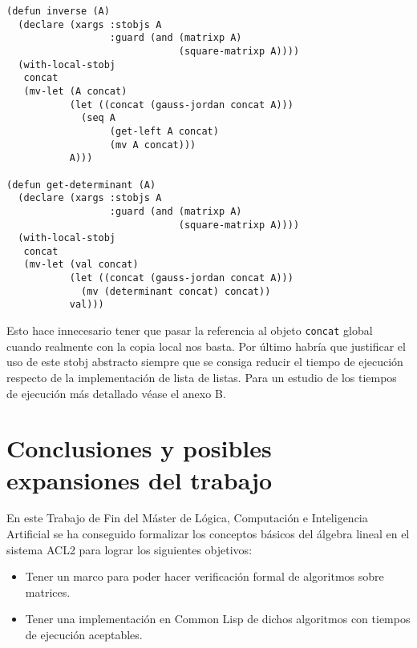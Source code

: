 \documentclass[a4paper,10pt]{article}
\begin{document}
\par \vspace{10pt}

\begin{lstlisting}[language=clips]
(defun inverse (A)
  (declare (xargs :stobjs A
                  :guard (and (matrixp A)
                              (square-matrixp A))))
  (with-local-stobj
   concat
   (mv-let (A concat)
           (let ((concat (gauss-jordan concat A)))
             (seq A
                  (get-left A concat)
                  (mv A concat)))
           A)))

(defun get-determinant (A)
  (declare (xargs :stobjs A
                  :guard (and (matrixp A)
                              (square-matrixp A))))
  (with-local-stobj
   concat
   (mv-let (val concat)
           (let ((concat (gauss-jordan concat A)))
             (mv (determinant concat) concat))
           val)))
\end{lstlisting}

\par \vspace{10pt}

Esto hace innecesario tener que pasar la referencia al objeto \texttt{concat} global cuando realmente con la copia local nos basta. Por último habría que justificar el uso de este stobj abstracto siempre que se consiga reducir el tiempo de ejecución respecto de la implementación de lista de listas. Para un estudio de los tiempos de ejecución más detallado véase el anexo B.

\newpage
\vspace{24pt}
\section{Conclusiones y posibles expansiones del trabajo}

En este Trabajo de Fin del Máster de Lógica, Computación e Inteligencia Artificial se ha conseguido formalizar los conceptos básicos del álgebra lineal en el sistema ACL2 para lograr los siguientes objetivos:

\par \vspace{10pt}

\begin{itemize}
	\item Tener un marco para poder hacer verificación formal de algoritmos sobre matrices.
	\item Tener una implementación en Common Lisp de dichos algoritmos con tiempos de ejecución aceptables.
\end{itemize}
\end{document}
